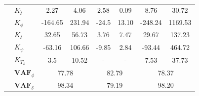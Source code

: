 \begin{table}[]
\begin{tabular}{llcccccc}
                                 & $K_{\dot{\delta}}$    & 2.27                                       & 4.06                                               & 2.58                                       & 0.09                                               & 8.76                                       & 30.72                                              \\
                                 & $K_{\phi} $           & -164.65                                    & 231.94                                             & -24.5                                      & 13.10                                              & -248.24                                    & 1169.53                                            \\
                                 & $K_\delta $           & 32.65                                      & 56.73                                              & 3.76                                       & 7.47                                               & 29.67                                      & 137.23                                             \\
                                 & $K_\psi $             & -63.16                                     & 106.66                                             & -9.85                                      & 2.84                                               & -93.44                                     & 464.72                                             \\
                                 & $K_{T_\delta}$        & 3.5                                        & 10.52                                              & -                                          & -                                                  & 7.53                                       & 37.73                                              \\ \cline{2-8} 
                                 & $\mathbf{VAF}_\phi$   & \multicolumn{2}{c}{77.78}                                                                       & \multicolumn{2}{c}{82.79}                                                                       & \multicolumn{2}{c}{78.37}                                                                       \\
                                 & $\mathbf{VAF}_\delta$ & \multicolumn{2}{c}{98.34}                                                                       & \multicolumn{2}{c}{79.19}                                                                       & \multicolumn{2}{c}{98.20}                                                                       \\

\end{tabular}
\end{table}
